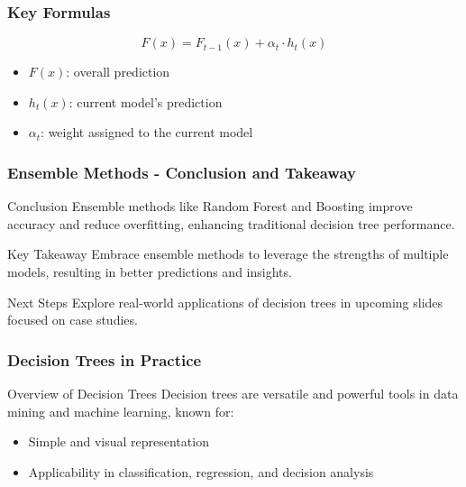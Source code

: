 \documentclass[aspectratio=169]{beamer}
\begin{document}
\begin{frame}[fragile]
    \frametitle{Key Formulas}
    \begin{equation}
        F(x) = F_{t-1}(x) + \alpha_t \cdot h_t(x)
    \end{equation}

    \begin{itemize}
        \item $F(x)$: overall prediction
        \item $h_t(x)$: current model's prediction
        \item $\alpha_t$: weight assigned to the current model
    \end{itemize}
\end{frame}

\begin{frame}[fragile]
    \frametitle{Ensemble Methods - Conclusion and Takeaway}
    \begin{block}{Conclusion}
        Ensemble methods like Random Forest and Boosting improve accuracy and reduce overfitting, enhancing traditional decision tree performance.
    \end{block}

    \begin{block}{Key Takeaway}
        Embrace ensemble methods to leverage the strengths of multiple models, resulting in better predictions and insights.
    \end{block}

    \begin{block}{Next Steps}
        Explore real-world applications of decision trees in upcoming slides focused on case studies.
    \end{block}
\end{frame}

\begin{frame}[fragile]
    \frametitle{Decision Trees in Practice}
    \begin{block}{Overview of Decision Trees}
        Decision trees are versatile and powerful tools in data mining and machine learning, known for:
        \begin{itemize}
            \item Simple and visual representation
            \item Applicability in classification, regression, and decision analysis
        \end{itemize}
    \end{block}
\end{frame}
\end{document}
